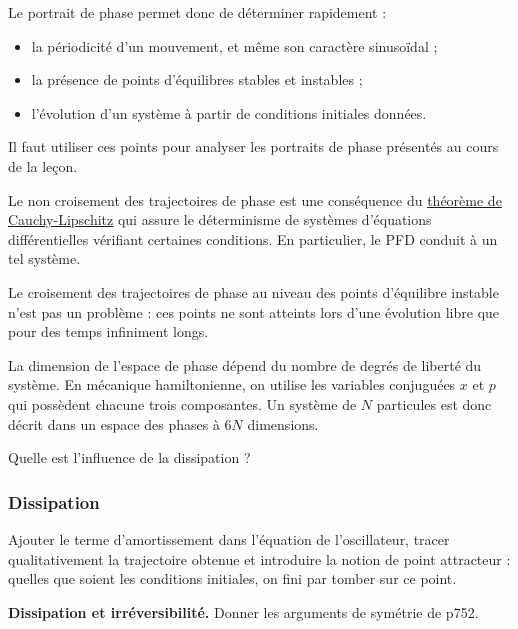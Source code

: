 Le portrait de phase permet donc de déterminer rapidement :
\begin{itemize}
\item la périodicité d'un mouvement, et même son caractère sinusoïdal ;
\item la présence de points d'équilibres stables et instables ;
\item l'évolution d'un système à partir de conditions initiales données.
\end{itemize}

\begin{remarque}
Il faut utiliser ces points pour analyser les portraits de phase présentés au cours de la leçon.

\noindent
Le non croisement des trajectoires de phase est une conséquence du \href{https://fr.wikipedia.org/wiki/Th\%C3\%A9or\%C3\%A8me_de_Cauchy-Lipschitz}{théorème de Cauchy-Lipschitz} qui assure le déterminisme de systèmes d'équations différentielles vérifiant certaines conditions.
En particulier, le PFD conduit à un tel système.

\noindent
Le croisement des trajectoires de phase au niveau des points d'équilibre instable n'est pas un problème : ces points ne sont atteints lors d'une évolution libre que pour des temps infiniment longs.

\noindent
La dimension de l'espace de phase dépend du nombre de degrés de liberté du système.
En mécanique hamiltonienne, on utilise les variables conjuguées $x$ et $p$ qui possèdent chacune trois composantes.
Un système de $N$ particules est donc décrit dans un espace des phases à $6N$ dimensions.
\end{remarque}

\begin{transition}
Quelle est l'influence de la dissipation ?
\end{transition}

\subsubsection{Dissipation}

Ajouter le terme d'amortissement dans l'équation de l'oscillateur, tracer qualitativement la trajectoire obtenue et introduire la notion de point attracteur : quelles que soient les conditions initiales, on fini par tomber sur ce point.

\begin{slide}
\textbf{Dissipation et irréversibilité.}
Donner les arguments de symétrie de \cite{Gie1992} p752.
\end{slide}

